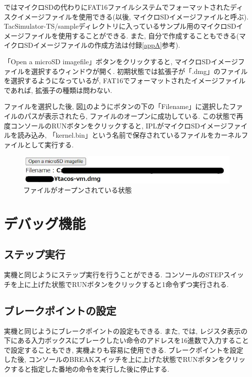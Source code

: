 \tacsim ではマイクロSDの代わりにFAT16ファイルシステムでフォーマットされたディスクイメージファイルを使用できる(以後, マイクロSDイメージファイルと呼ぶ). TacSimulator-TS/sampleディレクトリに入っているサンプル用のマイクロSDイメージファイルを使用することができる. また, 自分で作成することもできる(マイクロSDイメージファイルの作成方法は付録\ref{appA}参考).

「Open a microSD imagefile」ボタンをクリックすると, マイクロSDイメージファイルを選択するウィンドウが開く. 初期状態では拡張子が「.dmg」のファイルを選択するようになっているが, FAT16でフォーマットされたイメージファイルであれば, 拡張子の種類は問わない.

ファイルを選択した後, 図\ref{fig:ch3-filepath}のようにボタンの下の「Filename」に選択したファイルのパスが表示されたら, ファイルのオープンに成功している. この状態で再度コンソールのRUNボタンをクリックすると, IPLがマイクロSDイメージファイルを読み込み, 「kernel.bin」という名前で保存されているファイルをカーネルファイルとして実行する.

\begin{figure}[H]
    \centering
    \includegraphics[width=12cm]{"figs/chapter3-filepath.jpg"}
    \caption{ファイルがオープンされている状態} \label{fig:ch3-filepath}
\end{figure}


\section{デバッグ機能}

\subsection{ステップ実行}
実機と同じようにステップ実行を行うことができる. コンソールのSTEPスイッチを上に上げた状態でRUNボタンをクリックすると1命令ずつ実行される.

\subsection{ブレークポイントの設定}
実機と同じようにブレークポイントの設定もできる. また, \tacsim では, レジスタ表示の下にある入力ボックスにブレークしたい命令のアドレスを16進数で入力することで設定することもでき, 実機よりも容易に使用できる.
ブレークポイントを設定した後, コンソールのBREAKスイッチを上に上げた状態でRUNボタンをクリックすると指定した番地の命令を実行した後に停止する.

